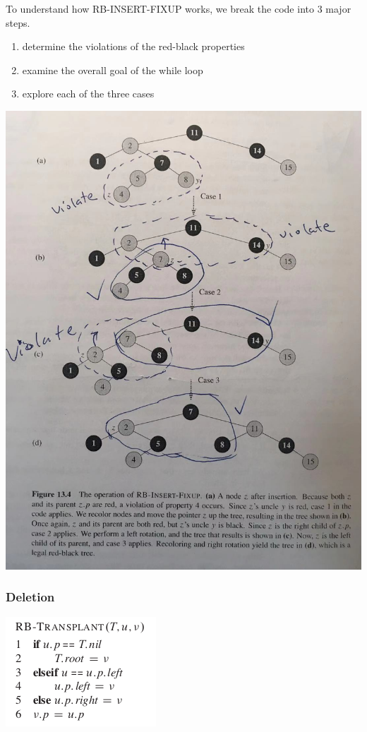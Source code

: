\documentclass[11pt]{article}
\begin{document}
To understand how RB-INSERT-FIXUP works, we break the code into 3 major steps. \\
\begin{enumerate}
\item determine the violations of the red-black properties \\
\item examine the overall goal of the while loop \\
\item explore each of the three cases \\
\end{enumerate}

\includegraphics[width=.9\linewidth]{pics/c13_insert_fixup_fig.png} \\


\subsubsection{Deletion}
\label{sec-4-4-4}
\includegraphics[width=.9\linewidth]{pics/c13_rb_transplant.png} \\
\end{document}
